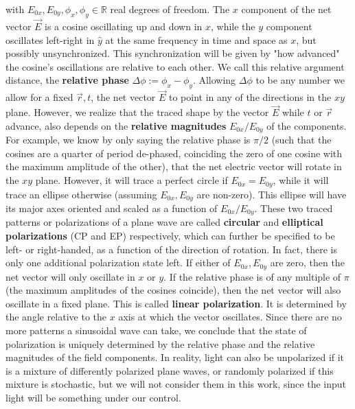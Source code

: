 \documentclass[11pt, a4paper, twoside]{article} %
\newcommand{\R}{\mathbb{R}} %
\begin{document}
with $E_{0x},E_{0y},\phi_x,\phi_y\in\R$ real degrees of freedom. The $x$ component of the net vector $\vec{E}$ is a cosine oscillating up and down in $\hat{x}$, while the $y$ component oscillates left-right in $\hat{y}$ at the same frequency in time and space as $x$, but possibly unsynchronized. This synchronization will be given by "how advanced" the cosine's oscillations are relative to each other. We call this relative argument distance, the {\bf relative phase} $\Delta \phi:=\phi_x-\phi_y$. Allowing $\Delta \phi$ to be any number we allow for a fixed $\vec{r},t$, the net vector $\vec{E}$ to point in any of the directions in the $xy$ plane. However, we realize that the traced shape by the vector $\vec{E}$ while $t$ or $\vec{r}$ advance, also depends on the {\bf relative magnitudes} $E_{0x}/E_{0y}$ of the components. For example, we know by only saying the relative phase is $\pi/2$ (such that the cosines are a quarter of period de-phased, coinciding the zero of one cosine with the maximum amplitude of the other), that the net electric vector will rotate in the $xy$ plane. However, it will trace a perfect circle if $E_{0x}=E_{0y}$, while it will trace an ellipse otherwise (assuming $E_{0x},E_{0y}$ are non-zero). This ellipse will have its major axes oriented and scaled as a function of $E_{0x}/E_{0y}$. These two traced patterns or polarizations of a plane wave are called {\bf circular} and {\bf elliptical polarizations} (CP and EP) respectively, which can further be specified to be left- or right-handed, as a function of the direction of rotation. In fact, there is only one additional polarization state left. If either of $E_{0x},E_{0y}$ are zero, then the net vector will only oscillate in $x$ or $y$. If the relative phase is of any multiple of $\pi$ (the maximum amplitudes of the cosines coincide), then the net vector will also oscillate in a fixed plane. This is called {\bf linear polarization}. It is determined by the angle relative to the $x$ axis at which the vector oscillates. Since there are no more patterns a sinusoidal wave can take, we conclude that the state of polarization is uniquely determined by the relative phase and the relative magnitudes of the field components. In reality, light can also be unpolarized if it is a mixture of differently polarized plane waves, or randomly polarized if this mixture is stochastic, but we will not consider them in this work, since the input light will be something under our control.
\end{document}
